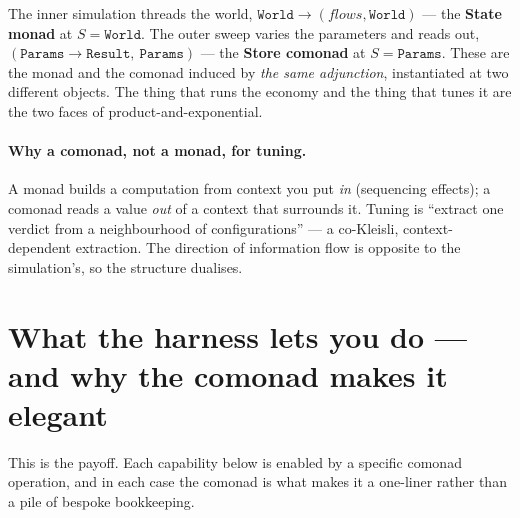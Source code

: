 \documentclass[11pt]{article}
\begin{document}
\begin{center}
\end{center}

\noindent The inner simulation threads the world, $\mathtt{World} \to
(\mathit{flows}, \mathtt{World})$ --- the \textbf{State monad} at $S =
\mathtt{World}$. The outer sweep varies the parameters and reads out, $(\mathtt{Params}
\to \mathtt{Result},\ \mathtt{Params})$ --- the \textbf{Store comonad} at $S =
\mathtt{Params}$. These are the monad and the comonad induced by \emph{the same
adjunction}, instantiated at two different objects. The thing that runs the
economy and the thing that tunes it are the two faces of product-and-exponential.

\paragraph{Why a comonad, not a monad, for tuning.} A monad builds a computation
from context you put \emph{in} (sequencing effects); a comonad reads a value
\emph{out} of a context that surrounds it. Tuning is ``extract one verdict from a
neighbourhood of configurations'' --- a co-Kleisli, context-dependent
extraction. The direction of information flow is opposite to the simulation's, so
the structure dualises.

\section{What the harness lets you do --- and why the comonad makes it elegant}

This is the payoff. Each capability below is enabled by a specific comonad
operation, and in each case the comonad is what makes it a one-liner rather than
a pile of bespoke bookkeeping.
\end{document}
